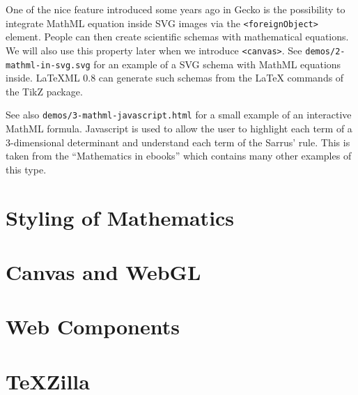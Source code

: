 One of the nice feature introduced some years ago in Gecko is the possibility
to integrate MathML equation inside SVG images via the {\tt <foreignObject>}
element. People can then create
scientific schemas with mathematical equations.
We will also use this property later when we introduce {\tt <canvas>}.
See {\tt demos/2-mathml-in-svg.svg} for an example of a SVG schema with
MathML equations inside. LaTeXML 0.8 can generate
such schemas from the LaTeX commands of the TikZ package.

See also {\tt demos/3-mathml-javascript.html} for a small example of an
interactive MathML formula. Javascript is used to allow the user to highlight
each term of a 3-dimensional determinant and understand each term of the
Sarrus' rule. This is taken from the ``Mathematics in ebooks'' which contains
many other examples of this type.

\section{Styling of Mathematics}



\section{Canvas and WebGL}


\section{Web Components}


\section{TeXZilla}

